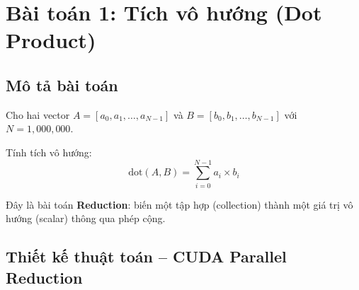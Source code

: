 \documentclass[12pt,a4paper]{article}
\begin{document}
\section{Bài toán 1: Tích vô hướng (Dot Product)}

\subsection{Mô tả bài toán}

Cho hai vector $A = [a_0, a_1, \ldots, a_{N-1}]$ và $B = [b_0, b_1, \ldots, b_{N-1}]$ với $N = 1{,}000{,}000$.

Tính tích vô hướng:
$$\text{dot}(A, B) = \sum_{i=0}^{N-1} a_i \times b_i$$

Đây là bài toán \textbf{Reduction}: biến một tập hợp (collection) thành một giá trị vô hướng (scalar) thông qua phép cộng.

\subsection{Thiết kế thuật toán -- CUDA Parallel Reduction}
\end{document}

